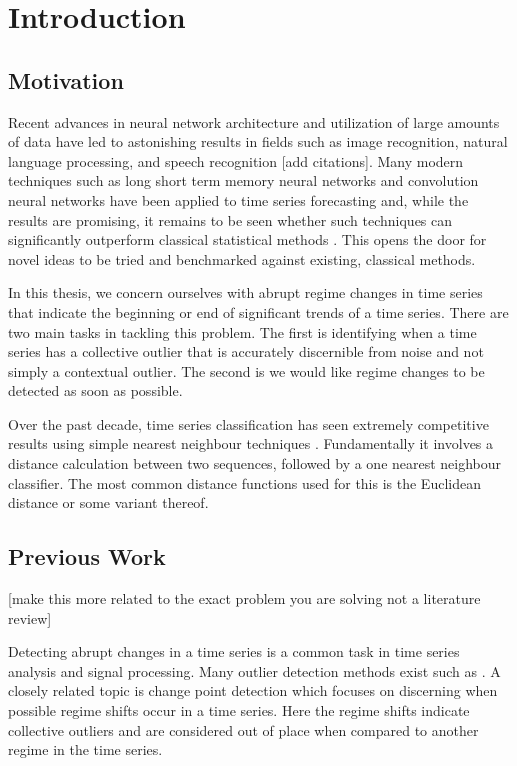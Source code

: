 \chapter{Introduction}
\section{Motivation}
Recent advances in neural network architecture and utilization of large amounts of data have led to astonishing results in fields such as image recognition, natural language processing, and speech recognition [add citations]. Many modern techniques such as long short term memory neural networks and convolution neural networks have been applied to time series forecasting and, while the results are promising, it remains to be seen whether such techniques can significantly outperform classical statistical methods \cite{makridakis2018statistical}. This opens the door for novel ideas to be tried and benchmarked against existing, classical methods.

In this thesis, we concern ourselves with abrupt regime changes in time series that indicate the beginning or end of significant trends of a time series. There are two main tasks in tackling this problem. The first is identifying when a time series has a collective outlier that is accurately discernible from noise and not simply a contextual outlier. The second is we would like regime changes to be detected as soon as possible. 

Over the past decade, time series classification has seen extremely competitive results using simple nearest neighbour techniques \cite{bagnall2017great}. Fundamentally it involves a distance calculation between two sequences, followed by a one nearest neighbour classifier. The most common distance functions used for this is the Euclidean distance or some variant thereof. 

\section{Previous Work}
[make this more related to the exact problem you are solving not a literature review]

Detecting abrupt changes in a time series is a common task in time series analysis and signal processing. Many outlier detection methods exist such as . A closely related topic is change point detection which focuses on discerning  when possible regime shifts occur in a time series. Here the regime shifts indicate collective outliers and are considered out of place when compared to another regime in the time series.

